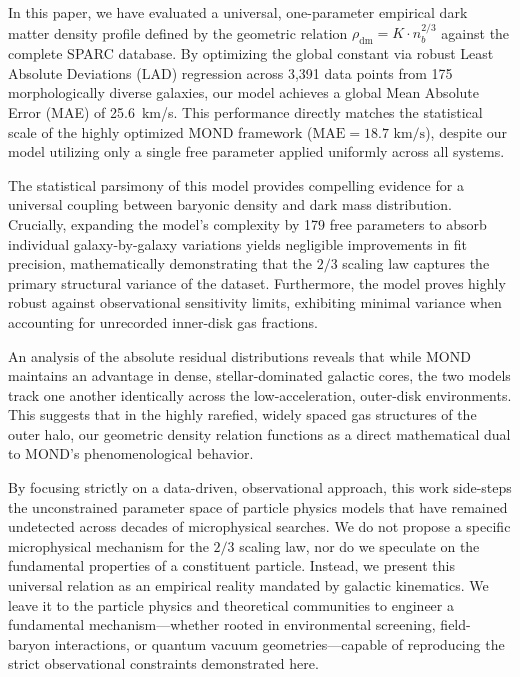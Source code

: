 \documentclass[twocolumn]{aastex631}
\begin{document}
In this paper, we have evaluated a universal, one-parameter empirical dark matter density profile defined by the geometric relation $\rho_{\text{dm}} = K \cdot n_b^{2/3}$ against the complete SPARC database. By optimizing the global constant via robust Least Absolute Deviations (LAD) regression across 3,391 data points from 175 morphologically diverse galaxies, our model achieves a global Mean Absolute Error (MAE) of 25.6~km/s. This performance directly matches the statistical scale of the highly optimized MOND framework ($\text{MAE} = 18.7\text{ km/s}$), despite our model utilizing only a single free parameter applied uniformly across all systems.

The statistical parsimony of this model provides compelling evidence for a universal coupling between baryonic density and dark mass distribution. Crucially, expanding the model’s complexity by 179 free parameters to absorb individual galaxy-by-galaxy variations yields negligible improvements in fit precision, mathematically demonstrating that the $2/3$ scaling law captures the primary structural variance of the dataset. Furthermore, the model proves highly robust against observational sensitivity limits, exhibiting minimal variance when accounting for unrecorded inner-disk gas fractions. 

An analysis of the absolute residual distributions reveals that while MOND maintains an advantage in dense, stellar-dominated galactic cores, the two models track one another identically across the low-acceleration, outer-disk environments. This suggests that in the highly rarefied, widely spaced gas structures of the outer halo, our geometric density relation functions as a direct mathematical dual to MOND’s phenomenological behavior.

By focusing strictly on a data-driven, observational approach, this work side-steps the unconstrained parameter space of particle physics models that have remained undetected across decades of microphysical searches. We do not propose a specific microphysical mechanism for the $2/3$ scaling law, nor do we speculate on the fundamental properties of a constituent particle. Instead, we present this universal relation as an empirical reality mandated by galactic kinematics. We leave it to the particle physics and theoretical communities to engineer a fundamental mechanism---whether rooted in environmental screening, field-baryon interactions, or quantum vacuum geometries---capable of reproducing the strict observational constraints demonstrated here.
\end{document}
